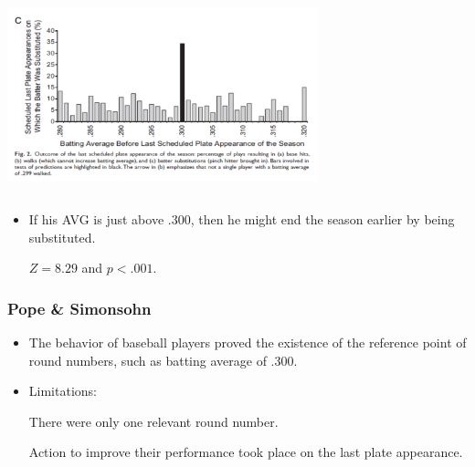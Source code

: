 \documentclass[dvipdfmx,12pt]{beamer}
\begin{document}
\begin{frame}

\begin{center}

\includegraphics[width=9cm,height=5.75cm]{Pope_Simonsohn_F2C.pdf}

\end{center}

 \begin{itemize}
 
 \item If his AVG is just above .300, then he might end the season earlier by being substituted.
 
 $Z=8.29$ and $p<.001$.
 
 \end{itemize}

\end{frame}

\begin{frame}\frametitle{Pope \& Simonsohn}

 \begin{itemize}
 
 \item The behavior of baseball players proved the existence of the reference point of round numbers, such as batting average of .300.
 
 \item Limitations:
 
 There were only one relevant round number.
 
 Action to improve their performance took place on the last plate appearance.
 
 \end{itemize}

\end{frame}
\end{document}
